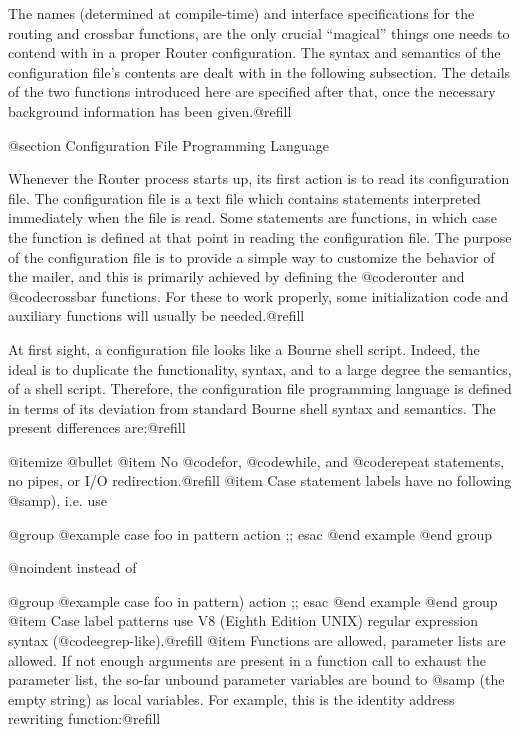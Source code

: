 {The names (determined at compile-time) and interface specifications for the
routing and crossbar functions, are the only crucial ``magical'' things one
needs to contend with in a proper Router configuration.  The syntax and
semantics of the configuration file's contents are dealt with in the
following subsection. The details of the two functions introduced here are
specified after that, once the necessary background information has been
given.@refill

@section Configuration File Programming Language

Whenever the Router process starts up, its first action is to read its
configuration file.  The configuration file is a text file which contains
statements interpreted immediately when the file is read.  Some statements
are functions, in which case the function is defined at that point in
reading the configuration file.  The purpose of the configuration file is
to provide a simple way to customize the behavior of the mailer, and this is
primarily achieved by defining the @code{router} and @code{crossbar}
functions.  For these to work properly, some initialization code and
auxiliary functions will usually be needed.@refill

At first sight, a configuration file looks like a Bourne shell script.
Indeed, the ideal is to duplicate the functionality, syntax, and to a large
degree the semantics, of a shell script.  Therefore, the configuration file
programming language is defined in terms of its deviation from standard
Bourne shell syntax and semantics.  The present differences are:@refill

@itemize @bullet
@item
No @code{for}, @code{while}, and @code{repeat} statements, no pipes,
or I/O redirection.@refill
@item
Case statement labels have no following @samp{)}, i.e. use

@group
@example
case foo in
pattern         action ;;
esac
@end example
@end group

@noindent
instead of

@group
@example
case foo in
pattern)        action ;;
esac
@end example
@end group
@item
Case label patterns use V8 (Eighth Edition UNIX) regular
expression syntax (@code{egrep}-like).@refill
@item
Functions are allowed, parameter lists are allowed. If not enough arguments
are present in a function call to exhaust the parameter list, the so-far
unbound parameter variables are bound to @samp{} (the empty string) as local
variables. For example, this is the identity address rewriting function:@refill

}
